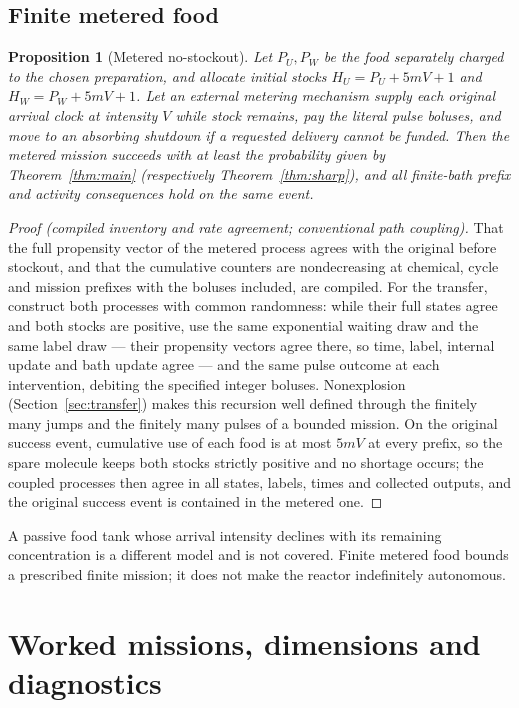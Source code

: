 \documentclass[11pt,a4paper]{article}
\theoremstyle{plain}
\newtheorem{proposition}[theorem]{Proposition}
\theoremstyle{definition}
\theoremstyle{remark}
\begin{document}
\subsection{Finite metered food}\label{sec:metered}

\begin{proposition}[Metered no-stockout]\label{prop:metered}
Let $P_U,P_W$ be the food separately charged to the chosen preparation, and allocate initial stocks $H_U=P_U+5mV+1$ and $H_W=P_W+5mV+1$. Let an external metering mechanism supply each original arrival clock at intensity $V$ while stock remains, pay the literal pulse boluses, and move to an absorbing shutdown if a requested delivery cannot be funded. Then the metered mission succeeds with at least the probability given by Theorem~\ref{thm:main} (respectively Theorem~\ref{thm:sharp}), and all finite-bath prefix and activity consequences hold on the same event.
\end{proposition}
\begin{proof}[Proof (compiled inventory and rate agreement; conventional path coupling)]
That the full propensity vector of the metered process agrees with the original before stockout, and that the cumulative counters are nondecreasing at chemical, cycle and mission prefixes with the boluses included, are compiled. For the transfer, construct both processes with common randomness: while their full states agree and both stocks are positive, use the same exponential waiting draw and the same label draw --- their propensity vectors agree there, so time, label, internal update and bath update agree --- and the same pulse outcome at each intervention, debiting the specified integer boluses. Nonexplosion (Section~\ref{sec:transfer}) makes this recursion well defined through the finitely many jumps and the finitely many pulses of a bounded mission. On the original success event, cumulative use of each food is at most $5mV$ at every prefix, so the spare molecule keeps both stocks strictly positive and no shortage occurs; the coupled processes then agree in all states, labels, times and collected outputs, and the original success event is contained in the metered one.
\end{proof}
A passive food tank whose arrival intensity declines with its remaining concentration is a different model and is not covered. Finite metered food bounds a prescribed finite mission; it does not make the reactor indefinitely autonomous.

\section{Worked missions, dimensions and diagnostics}\label{sec:examples}
\end{document}
